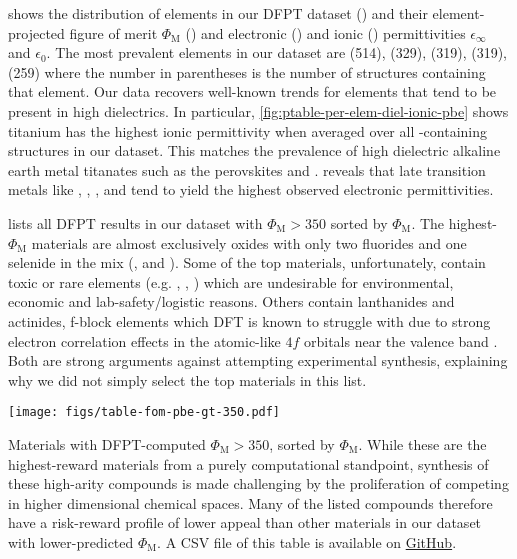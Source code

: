 \documentclass{article}
\newcommand{\fom}[1][]{\Phi_\text{M#1}}
\begin{document}
 shows the distribution of elements in our DFPT dataset () and their element-projected figure of merit $\fom$ () and electronic () and ionic () permittivities $\epsilon_\infty$ and $\epsilon_0$.
The most prevalent elements in our dataset are  (514),  (329),  (319),  (319),  (259) where the number in parentheses is the number of structures containing that element.
Our data recovers well-known trends for elements that tend to be present in high dielectrics.
In particular, \cref{fig:ptable-per-elem-diel-ionic-pbe} shows titanium has the highest ionic permittivity when averaged over all -containing structures in our dataset.
This matches the prevalence of high dielectric alkaline earth metal titanates such as the perovskites  and .
 reveals that late transition metals like , , ,  and  tend to yield the highest observed electronic permittivities.

 lists all DFPT results in our dataset with $\fom > 350$ sorted by $\fom$.
The highest-$\fom$ materials are almost exclusively oxides with only two fluorides and one selenide in the mix (,  and ).
Some of the top materials, unfortunately, contain toxic or rare elements (e.g. , , ) which are undesirable for environmental, economic and lab-safety/logistic reasons.
Others contain lanthanides and actinides, f-block elements which DFT is known to struggle with due to strong electron correlation effects in the atomic-like $4f$ orbitals near the valence band \cite{soderlind_groundstate_2014}.
Both are strong arguments against attempting experimental synthesis, explaining why we did not simply select the top materials in this list.

\begin{table}[htbp!]
    \centering
    \texttt{[image: figs/table-fom-pbe-gt-350.pdf]}
    \caption{
        Materials with DFPT-computed $\fom > 350$, sorted by $\fom$.
        While these are the highest-reward materials from a purely computational standpoint, synthesis of these high-arity compounds is made challenging by the proliferation of competing in higher dimensional chemical spaces.
        Many of the listed compounds therefore have a risk-reward profile of lower appeal than other materials in our dataset with lower-predicted $\fom$.
        A CSV file of this table is available on \href{https://github.com/janosh/dielectrics/blob/b6f46410e8fcafd727006956380867d476e32177/data/our-data-with-fom-pbe-gt-350.csv}{GitHub}.
    }
\end{table}
\label{tab:table-fom-pbe-gt-350}
\end{document}
